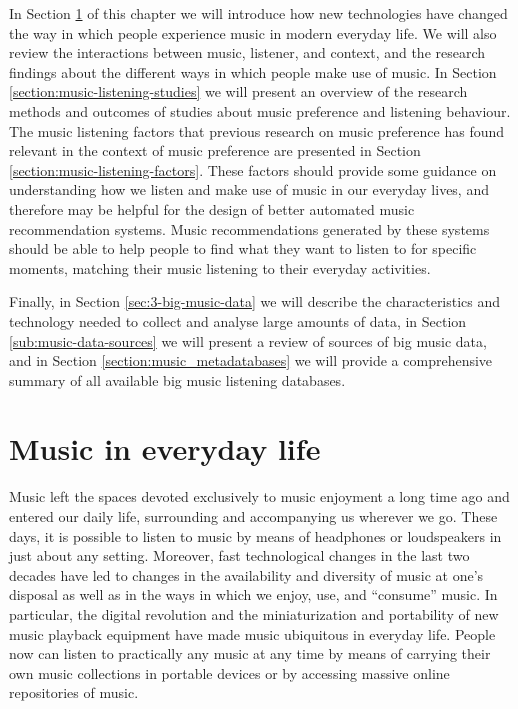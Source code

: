 In Section \ref{section:musiceveryday} of this chapter we will introduce how new technologies have changed the way in which people experience music in modern everyday life. We will also review the interactions between music, listener, and context, and the research findings about the different ways in which people make use of music.
In Section \ref{section:music-listening-studies} we will present an overview of the research methods and outcomes of studies about music preference and listening behaviour. 
The music listening factors that previous research on music preference has found relevant in the context of music preference are presented in Section \ref{section:music-listening-factors}.
These factors should provide some guidance on understanding how we listen and make use of music in our everyday lives, and therefore may be helpful for the design of better automated music recommendation systems. Music recommendations generated by these systems should be able to help people to find what they want to listen to for specific moments, matching their music listening to their everyday activities.


Finally, in Section \ref{sec:3-big-music-data} we will describe the characteristics and technology needed to collect and analyse large amounts of data, in Section \ref{sub:music-data-sources} we will present a review of sources of big music data, and in Section \ref{section:music_metadatabases} we will provide a comprehensive summary of all available big music listening databases. 




\section{Music in everyday life} \label{section:musiceveryday}
Music left the spaces devoted exclusively to music enjoyment a long time ago and entered our daily life, surrounding and accompanying us wherever we go. These days, it is possible to listen to music by means of headphones or loudspeakers in just about any setting.
Moreover, fast technological changes in the last two decades have led to changes in the availability and diversity of music at one's disposal as well as in the ways in which we enjoy, use, and ``consume'' music. In particular, the digital revolution and the miniaturization and portability of new music playback equipment have made music ubiquitous in everyday life. People now can listen to practically any music at any time by means of carrying their own music collections in portable devices or by accessing massive online repositories of music. 

